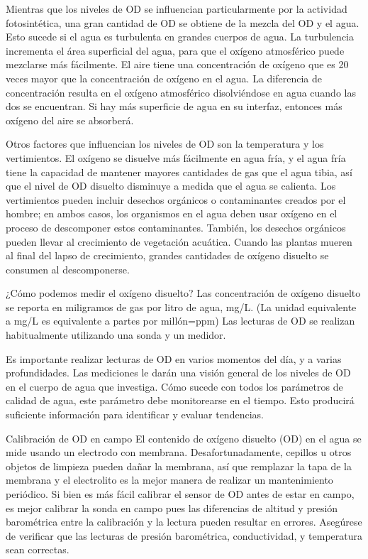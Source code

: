 Mientras que los niveles de OD se influencian particularmente por la actividad fotosintética, una gran cantidad de OD se obtiene de la mezcla del OD y el agua. Esto sucede si el agua es turbulenta en grandes cuerpos de agua. La turbulencia incrementa el área superficial del agua, para que el oxígeno atmosférico puede mezclarse más fácilmente. El aire tiene una concentración de oxígeno que es 20 veces mayor que la concentración de oxígeno en el agua. La diferencia de concentración resulta en el oxígeno atmosférico disolviéndose en agua cuando las dos se encuentran. Si hay más superficie de agua en su interfaz, entonces más oxígeno del aire se absorberá.

Otros factores que influencian los niveles de OD son la temperatura y los vertimientos. El oxígeno se disuelve más fácilmente en agua fría, y el agua fría tiene la capacidad de mantener mayores cantidades de gas que el agua tibia, así que el nivel de OD disuelto disminuye a medida que el agua se calienta. Los vertimientos pueden incluir desechos orgánicos o contaminantes creados por el hombre; en ambos casos, los organismos en el agua deben usar oxígeno en el proceso de descomponer estos contaminantes.  También, los desechos orgánicos pueden llevar al crecimiento de vegetación acuática.  Cuando las plantas mueren al final del lapso de crecimiento, grandes cantidades de oxígeno disuelto se consumen al descomponerse.

¿Cómo podemos medir el oxígeno disuelto?
Las concentración de oxígeno disuelto se reporta en miligramos de gas por litro de agua, mg/L. (La unidad equivalente a mg/L es equivalente a partes por millón=ppm)  Las lecturas de OD se realizan habitualmente utilizando una sonda y un medidor.

 
Es importante realizar lecturas de OD en varios momentos del día, y a varias profundidades. Las mediciones le darán una visión general de los niveles de OD en el cuerpo de agua que investiga. Cómo sucede con todos los parámetros de calidad de agua, este parámetro debe monitorearse en el tiempo. Esto producirá suficiente información para identificar y evaluar tendencias.

Calibración de OD en campo
El contenido de oxígeno disuelto (OD) en el agua se mide usando un electrodo con membrana. Desafortunadamente, cepillos u otros objetos de limpieza pueden dañar la membrana, así que remplazar la tapa de la membrana y el electrolito es la mejor manera de realizar un mantenimiento periódico. Si bien es más fácil calibrar el sensor de OD antes de estar en campo, es mejor calibrar la sonda en campo pues las diferencias de altitud y presión barométrica entre la calibración y la lectura pueden resultar en errores. Asegúrese de verificar que las lecturas de presión barométrica, conductividad, y temperatura sean correctas.

